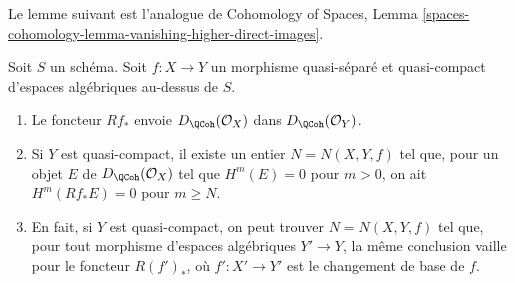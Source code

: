 \noindent
Le lemme suivant est l'analogue de
Cohomology of Spaces, Lemma
\ref{spaces-cohomology-lemma-vanishing-higher-direct-images}.

\begin{lemma}
\label{lemma-quasi-coherence-direct-image}
Soit $S$ un schéma. Soit $f : X \to Y$ un morphisme quasi-séparé et quasi-compact
d'espaces algébriques au-dessus de $S$.
\begin{enumerate}
\item Le foncteur $Rf_*$ envoie $D_\QCoh(\mathcal{O}_X)$
dans $D_\QCoh(\mathcal{O}_Y)$.
\item Si $Y$ est quasi-compact, il existe un entier $N = N(X, Y, f)$
tel que, pour un objet $E$ de $D_\QCoh(\mathcal{O}_X)$
tel que $H^m(E) = 0$ pour $m > 0$, on ait
$H^m(Rf_*E) = 0$ pour $m \geq N$.
\item En fait, si $Y$ est quasi-compact, on peut trouver $N = N(X, Y, f)$
tel que, pour tout morphisme d'espaces algébriques $Y' \to Y$,
la même conclusion vaille pour le foncteur $R(f')_*$,
où $f' : X' \to Y'$ est le changement de base de $f$.
\end{enumerate}
\end{lemma}

